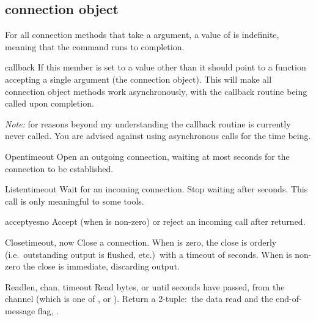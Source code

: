 \subsection{connection object}
\label{connection-object}

For all connection methods that take a  argument, a value
of  is indefinite, meaning that the command runs to completion.

\begin{memberdesc}[connection]{callback}
If this member is set to a value other than  it should point
to a function accepting a single argument (the connection
object). This will make all connection object methods work
asynchronously, with the callback routine being called upon
completion.

\emph{Note:} for reasons beyond my understanding the callback routine
is currently never called. You are advised against using asynchronous
calls for the time being.
\end{memberdesc}


\begin{methoddesc}[connection]{Open}{timeout}
Open an outgoing connection, waiting at most  seconds for
the connection to be established.
\end{methoddesc}

\begin{methoddesc}[connection]{Listen}{timeout}
Wait for an incoming connection. Stop waiting after 
seconds. This call is only meaningful to some tools.
\end{methoddesc}

\begin{methoddesc}[connection]{accept}{yesno}
Accept (when  is non-zero) or reject an incoming call after
 returned.
\end{methoddesc}

\begin{methoddesc}[connection]{Close}{timeout, now}
Close a connection. When  is zero, the close is orderly
(i.e.\ outstanding output is flushed, etc.)\ with a timeout of
 seconds. When  is non-zero the close is
immediate, discarding output.
\end{methoddesc}

\begin{methoddesc}[connection]{Read}{len, chan, timeout}
Read  bytes, or until  seconds have passed, from 
the channel  (which is one of ,
 or ). Return a 2-tuple:\ the data
read and the end-of-message flag, .
\end{methoddesc}

